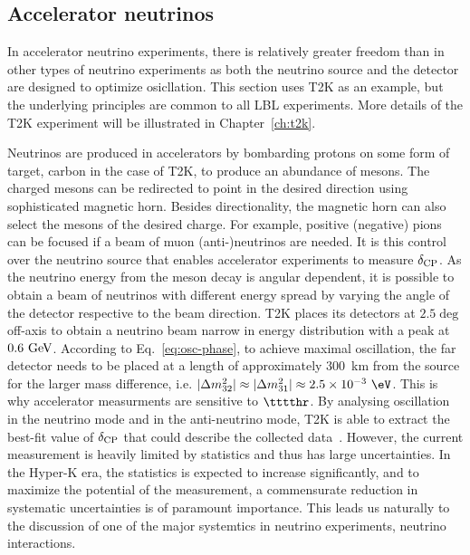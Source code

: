 \subsection{Accelerator neutrinos}
  In accelerator neutrino experiments, there is relatively greater freedom than in other types of neutrino experiments as both the neutrino source and the detector are designed to optimize osicllation.
  This section uses T2K as an example, but the underlying principles are common to all LBL experiments.
  More details of the T2K experiment will be illustrated in Chapter~\ref{ch:t2k}.

  Neutrinos are produced in accelerators by bombarding protons on some form of target, carbon in the case of T2K, to produce an abundance of mesons.
  The charged mesons can be redirected to point in the desired direction using sophisticated magnetic horn.
  Besides directionality, the magnetic horn can also select the mesons of the desired charge.
  For example, positive (negative) pions can be focused if a beam of muon (anti-)neutrinos are needed.
  It is this control over the neutrino source that enables accelerator experiments to measure $\delta_\textrm{CP}$.
  As the neutrino energy from the meson decay is angular dependent, it is possible to obtain a beam of neutrinos with different energy spread by varying the angle of the detector respective to the beam direction. 
  T2K places its detectors at $2.5\deg$ off-axis to obtain a neutrino beam narrow in energy distribution with a peak at $0.6~\textrm{GeV}$.
  According to Eq.~\ref{eq:osc-phase}, to achieve maximal oscillation, the far detector needs to be placed at a length of approximately $300$~km from the source for the larger mass difference, i.e. $\delmthrt\approx\delmthro\approx2.5\times10^{-3}~\eV$.
  This is why accelerator measurments are sensitive to $\tttthr$.
  By analysing oscillation in the neutrino mode and in the anti-neutrino mode, T2K is able to extract the best-fit value of $\delta_\textrm{CP}$ that could describe the collected data~\cite{T2K:2019bcf}.
  However, the current measurement is heavily limited by statistics and thus has large uncertainties.
  In the Hyper-K era, the statistics is expected to increase significantly, and to maximize the potential of the measurement, a commensurate reduction in systematic uncertainties is of paramount importance.
  This leads us naturally to the discussion of one of the major systemtics in neutrino experiments, neutrino interactions.

